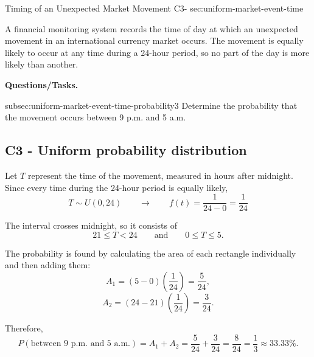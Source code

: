 	
	\sectionScored
	{Timing of an Unexpected Market Movement}
	{C3-}
	{sec:uniform-market-event-time}
	{
		A financial monitoring system records the time of day at which an
		unexpected movement in an international currency market occurs. The
		movement is equally likely to occur at any time during a 24-hour period,
		so no part of the day is more likely than another.
		
		\textbf{Questions/Tasks.}
		\begin{enumerate}
			\CriterionTask
			{subsec:uniform-market-event-time-probability}{3}
			{Determine the probability that the movement occurs between 9 p.m. and 5 a.m. }
		\end{enumerate}
		
		\label{subsec:uniform-market-event-time-probability}
		\subsection*{C3 - Uniform probability distribution }
		
		Let \(T\) represent the time of the movement, measured in hours after
		midnight. Since every time during the 24-hour period is equally likely,
		\[
		T\sim U(0,24) \qquad \longrightarrow \qquad 
		f(t)=\frac1{24 - 0}=\frac1{24}
		\]
		
		The interval crosses midnight, so it consists of
		\[
		21\le T<24
		\qquad\text{and}\qquad
		0\le T\le5.
		\]
		
		The probability is found by calculating the area of each rectangle
		individually and then adding them:
		\[
		A_1=(5-0)\left(\frac1{24}\right)
		=\frac5{24},
		\]
		\[
		A_2=(24-21)\left(\frac1{24}\right)
		=\frac3{24}.
		\]
		
		Therefore,
		\[
		P(\text{between 9 p.m. and 5 a.m.})
		=
		A_1+A_2
		=
		\frac5{24}+\frac3{24}
		= \frac8{24} = 
		\boxed{\frac13\approx33.33\%}.
		\]
		
		}
